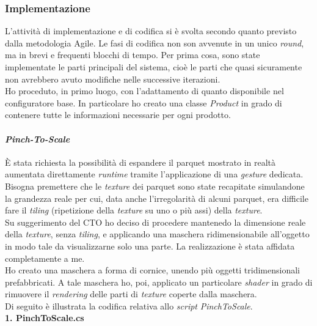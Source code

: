 \subsubsection{Implementazione}
L'attivit\`a di implementazione e di codifica si \`e svolta secondo quanto previsto dalla metodologia Agile. Le fasi di codifica non son avvenute in un unico \textit{round}, ma in brevi e frequenti blocchi di tempo. Per prima cosa, sono state implementate le parti principali del sistema, cio\`e le parti che quasi sicuramente non avrebbero avuto modifiche nelle successive iterazioni.\\
\noindent
Ho proceduto, in primo luogo, con l'adattamento di quanto disponibile nel configuratore base. In particolare ho creato una classe \textit{Product} in grado di contenere tutte le informazioni necessarie per ogni prodotto.\\

\paragraph{\textit{Pinch-To-Scale}}
\`E stata richiesta la possibilit\`a di espandere il parquet mostrato in realt\`a aumentata direttamente \textit{runtime} tramite l'applicazione di una \textit{gesture} dedicata.\\
Bisogna premettere che le \textit{texture\gloss} dei parquet sono state recapitate simulandone la grandezza reale per cui, data anche l'irregolarit\`a di alcuni parquet, era difficile fare il \textit{tiling} (ripetizione della \textit{texture\gloss} su uno o pi\`u assi) della \textit{texture\gloss}.\\
Su suggerimento del CTO ho deciso di procedere mantenedo la dimensione reale della \textit{texture\gloss}, senza \textit{tiling}, e applicando una maschera ridimensionabile all'oggetto in modo tale da visualizzarne solo una parte. La realizzazione \`e stata affidata completamente a me.\\
Ho creato una maschera a forma di cornice, unendo pi\`u oggetti tridimensionali prefabbricati. A tale maschera ho, poi, applicato un particolare \textit{shader} in grado di rimuovere il \textit{rendering} delle parti di \textit{texture\gloss} coperte dalla maschera.\\
Di seguito \`e illustrata la codifica relativa allo \textit{script} \textit{PinchToScale}.\\
\noindent
\textbf{1. PinchToScale.cs}

